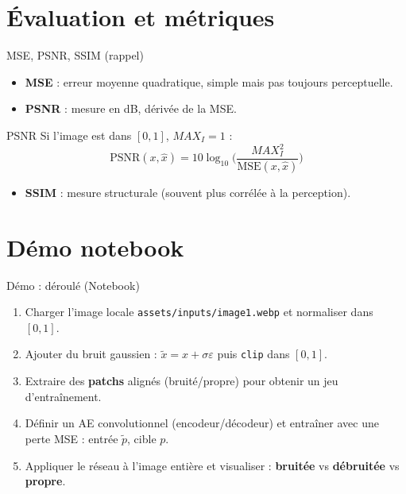 \documentclass[11pt,aspectratio=169]{beamer}
\begin{document}
\section{Évaluation et métriques}

\begin{frame}{MSE, PSNR, SSIM (rappel)}
\begin{itemize}
  \item \textbf{MSE} : erreur moyenne quadratique, simple mais pas toujours perceptuelle.
  \item \textbf{PSNR} : mesure en dB, dérivée de la MSE.
\end{itemize}

\begin{block}{PSNR}
Si l'image est dans $[0,1]$, $MAX_I=1$ :
\[
\mathrm{PSNR}(x,\hat{x}) = 10\log_{10}\Big(\frac{MAX_I^2}{\mathrm{MSE}(x,\hat{x})}\Big)
\]
\end{block}

\begin{itemize}
  \item \textbf{SSIM} : mesure structurale (souvent plus corrélée à la perception).
\end{itemize}
\end{frame}

\section{Démo notebook}

\begin{frame}{Démo : déroulé (Notebook)}
\begin{enumerate}
  \item Charger l'image locale \texttt{assets/inputs/image1.webp} et normaliser dans $[0,1]$.
  \item Ajouter du bruit gaussien : $\tilde{x} = x + \sigma\varepsilon$ puis \texttt{clip} dans $[0,1]$.
  \item Extraire des \textbf{patchs} alignés (bruité/propre) pour obtenir un jeu d'entraînement.
  \item Définir un AE convolutionnel (encodeur/décodeur) et entraîner avec une perte MSE : entrée $\tilde{p}$, cible $p$.
  \item Appliquer le réseau à l'image entière et visualiser : \textbf{bruitée} vs \textbf{débruitée} vs \textbf{propre}.
\end{enumerate}
\end{frame}
\end{document}
